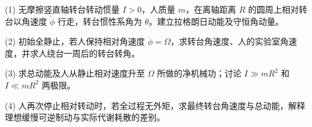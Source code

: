 (1) 无摩擦竖直轴转台转动惯量 \(I>0\)，人质量 \(m\)，在离轴距离 \(R\) 的圆周上相对转台以角速度 \(\dot\phi\) 行走，转台惯性系角为 \(\theta\)。建立拉格朗日动能及守恒角动量。

(2) 初始全静止，若人保持相对角速度 \(\dot\phi=\Omega\)，求转台角速度、人的实验室角速度，并求人绕台一周后的转台转角。

(3) 求总动能及人从静止相对速度升至 \(\Omega\) 所做的净机械功；讨论 \(I\gg mR^2\) 和 \(I\ll mR^2\) 两极限。

(4) 人再次停止相对转动时，若全过程无外矩，求最终转台角速度与总动能，解释理想缓慢可逆制动与实际代谢耗散的差别。

